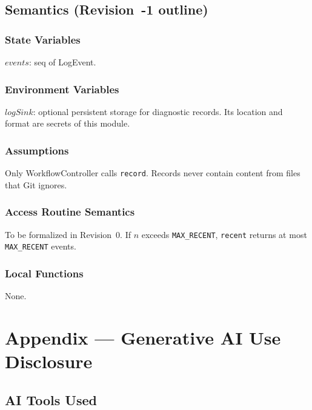 \documentclass[12pt, titlepage]{article}
\begin{document}
\subsection{Semantics (Revision~-1 outline)}

\subsubsection{State Variables}

$events$: seq of LogEvent.

\subsubsection{Environment Variables}

$logSink$: optional persistent storage for diagnostic records. Its location
and format are secrets of this module.

\subsubsection{Assumptions}

Only WorkflowController calls \texttt{record}. Records never contain content
from files that Git ignores.

\subsubsection{Access Routine Semantics}

To be formalized in Revision~0. If $n$ exceeds \texttt{MAX\_RECENT},
\texttt{recent} returns at most \texttt{MAX\_RECENT} events.

\subsubsection{Local Functions}

None.

\newpage

\section{Appendix --- Generative AI Use Disclosure}

\subsection{AI Tools Used}
\end{document}
